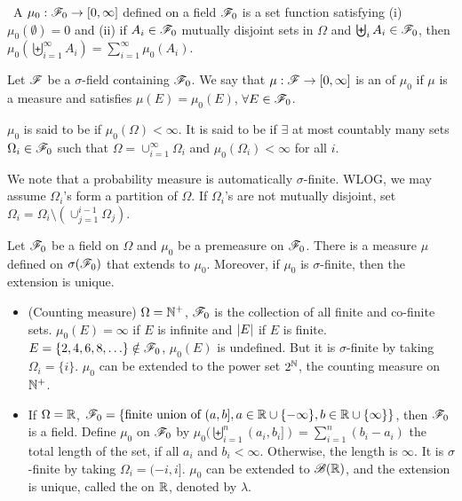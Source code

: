 \documentclass[10pt,a4paper]{article}
\begin{document}
\begin{defbox}
	\begin{definition}[Concepts]\label{def:premea-extension-sigmaFinite}
		\
		A  $\mu_0:\mathscr{F}_0\to [0,\infty ]$ defined on a field $\mathscr{F}_0$ is a set function satisfying (i) $\mu_0(\emptyset)=0$ and (ii) if $A_i\in\mathscr{F}_0$ mutually disjoint sets in $\Omega$ and $\biguplus_i A_i\in\mathscr{F}_0$, then $\mu_0(\biguplus_{i=1}^\infty A_i)=\sum_{i=1}^{\infty }\mu_0(A_i)$.    

		Let $\mathscr{F}$ be a $\sigma$-field containing $\mathscr{F}_0$. We say that $\mu:\mathscr{F}\to[0,\infty ]$ is an  of $\mu_0$ if $\mu$ is a measure and satisfies $\mu(E)=\mu_0(E)$, $\forall E\in\mathscr{F}_0$.     

		$\mu_0$ is said to be  if $\mu_0(\Omega)<\infty $. It is said to be  if $\exists$ at most countably many sets $\Omega_i\in\mathscr{F}_0$ such that $\Omega=\cup_{i=1}^\infty \Omega_i$ and $\mu_0(\Omega_i)<\infty $ for all $i$.            
	\end{definition}
\end{defbox}
We note that a probability measure is automatically $\sigma$-finite. WLOG, we may assume $\Omega_i$'s form a partition of $\Omega$. If $\Omega_i$'s are not mutually disjoint, set $\Omega_i=\Omega_i\setminus(\cup_{j=1}^{i-1}\Omega_j)$. 

\begin{thmbox}
	\begin{theorem}\label{thm:extension}
		\rm Let $\mathscr{F}_0$ be a field on $\Omega$ and $\mu_0$ be a premeasure on $\mathscr{F}_0$. There is a measure $\mu$ defined on $\sigma(\mathscr{F}_0)$ that extends to $\mu_0$. Moreover, if $\mu_0$ is $\sigma$-finite, then the extension is unique.         
	\end{theorem}
\end{thmbox}

\begin{itemize}
	\item (Counting measure) $\Omega=\mathbb N^+$, $\mathscr{F}_0$ is the collection of all finite and co-finite sets. $\mu_0(E)=\infty $ if $E$ is infinite and $\left\lvert E\right\rvert$ if $E$ is finite. $E=\{2,4,6,8,\ldots\}\notin \mathscr{F}_0$, $\mu_0(E)$ is undefined. But it is $\sigma$-finite by taking $\Omega_i=\{i\}$. $\mu_0$ can be extended to the power set $2^{\mathbb N}$, the counting measure on $\mathbb N^+$.   
	\item If $\Omega=\mathbb R$, $\mathscr{F}_0=\{\text{finite union of }(a,b], a\in\mathbb R\cup\{-\infty \}, b\in\mathbb R\cup\{\infty \}\}$, then $\mathscr{F}_0$ is a field. Define $\mu_0$ on $\mathscr{F}_0$ by $\mu_0(\biguplus_{i=1}^n (a_i,b_i])=\sum_{i=1}^{n}(b_i-a_i)$ the total length of the set, if all $a_i$ and $b_i<\infty $. Otherwise, the length is $\infty $. It is $\sigma$-finite by taking $\Omega_i=(-i,i]$. $\mu_0$ can be extended to $\mathscr{B}(\mathbb R)$, and the extension is unique, called the  on $\mathbb R$, denoted by $\lambda$.      
\end{itemize}
\end{document}
